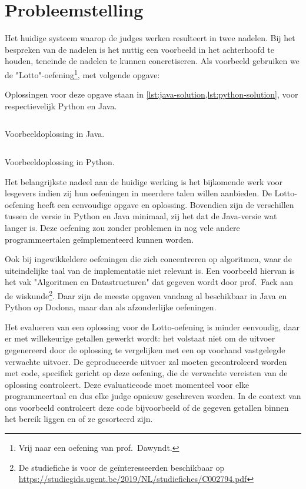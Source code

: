 \section{Probleemstelling}\label{sec:probleemstelling}

Het huidige systeem waarop de judges werken resulteert in twee nadelen.
Bij het bespreken van de nadelen is het nuttig een voorbeeld in het achterhoofd te houden, teneinde de nadelen te kunnen concretiseren.
Als voorbeeld gebruiken we de "Lotto"-oefening\footnote{Vrij naar een oefening van prof.\ Dawyndt.}, met volgende opgave:

\begin{quotation}
\end{quotation}

Oplossingen voor deze opgave staan in \cref{lst:java-solution,lst:python-solution}, voor respectievelijk Python en Java.

\begin{listing}
    \inputminted{java}{code/correct-solution.java}
    \caption{Voorbeeldoplossing in Java.}
    \label{lst:java-solution}
\end{listing}

\begin{listing}
    \inputminted{python3}{code/correct-solution.py}
    \caption{Voorbeeldoplossing in Python.}
    \label{lst:python-solution}
\end{listing}

Het belangrijkste nadeel aan de huidige werking is het bijkomende werk voor lesgevers indien zij hun oefeningen in meerdere talen willen aanbieden.
De Lotto-oefening heeft een eenvoudige opgave en oplossing.
Bovendien zijn de verschillen tussen de versie in Python en Java minimaal, zij het dat de Java-versie wat langer is.
Deze oefening zou zonder problemen in nog vele andere programmeertalen geïmplementeerd kunnen worden.

Ook bij ingewikkeldere oefeningen die zich concentreren op algoritmen, waar de uiteindelijke taal van de implementatie niet relevant is.
Een voorbeeld hiervan is het vak "Algoritmen en Datastructuren" dat gegeven wordt door prof.\ Fack aan de wiskunde\footnote{De studiefiche is voor de geïnteresseerden beschikbaar op \url{https://studiegids.ugent.be/2019/NL/studiefiches/C002794.pdf}}.
Daar zijn de meeste opgaven vandaag al beschikbaar in Java en Python op Dodona, maar dan als afzonderlijke oefeningen.

Het evalueren van een oplossing voor de Lotto-oefening is minder eenvoudig, daar er met willekeurige getallen gewerkt wordt: het volstaat niet om de uitvoer gegenereerd door de oplossing te vergelijken met een op voorhand vastgelegde verwachte uitvoer.
De geproduceerde uitvoer zal moeten gecontroleerd worden met code, specifiek gericht op deze oefening, die de verwachte vereisten van de oplossing controleert.
Deze evaluatiecode moet momenteel voor elke programmeertaal en dus elke judge opnieuw geschreven worden.
In de context van ons voorbeeld controleert deze code bijvoorbeeld of de gegeven getallen binnen het bereik liggen en of ze gesorteerd zijn.

